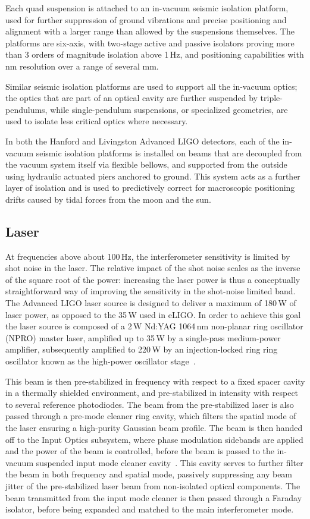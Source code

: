 Each quad suspension is attached to an in-vacuum seismic isolation platform, 
used for further suppression of ground vibrations and precise positioning and 
alignment with a larger range than allowed by the suspensions themselves. The 
platforms are six-axis, with two-stage active and passive isolators proving more 
than 3 orders of magnitude isolation above 1\,Hz, and positioning capabilities 
with nm resolution over a range of several mm.

Similar seismic isolation platforms are used to support all the in-vacuum optics; 
the optics that are part of an optical cavity are further suspended by triple-pendulums, while 
single-pendulum suspensions, or specialized geometries, are used to isolate 
less critical optics where necessary.

In both the Hanford and Livingston Advanced LIGO detectors, 
each of the in-vacuum seismic isolation platforms is 
installed on beams that are decoupled from the vacuum system itself via 
flexible bellows, and supported from the outside using hydraulic actuated 
piers anchored to ground.
This system acts as a further layer of isolation and is used to predictively correct for macroscopic positioning drifts caused by tidal forces from the moon and the sun.

	
\subsection{Laser}
At frequencies above about 100\,Hz, the interferometer sensitivity is limited by shot 
noise in the laser. The relative impact of the shot noise scales as the inverse of the 
square root of the power: increasing the laser power is thus a conceptually 
straightforward way of improving the sensitivity in the shot-noise limited band. 
The Advanced LIGO laser source is designed to deliver a maximum of 180\,W of laser power, as opposed to the 35\,W used in eLIGO.
In order to achieve this goal the laser source is composed of a 2\,W Nd:YAG 1064\,nm non-planar ring oscillator (NPRO) master laser, amplified up to 35\,W by a single-pass medium-power amplifier, subsequently amplified to 220\,W by an injection-locked ring ring oscillator known as the high-power oscillator stage~\cite{Kwee_2012}. 

This beam is then pre-stabilized in frequency with respect to a fixed spacer cavity in a thermally shielded environment, and pre-stabilized in intensity with respect to several reference photodiodes. 
The beam from the pre-stabilized laser is also passed through a pre-mode cleaner ring cavity, which filters the spatial mode of the laser ensuring a high-purity Gaussian beam profile. 
The beam is then handed off to the Input Optics subsystem, where phase modulation sidebands are applied and the power of the beam is controlled, before the beam is passed to the in-vacuum suspended input mode cleaner cavity~\cite{Mueller_2016}. 
This cavity serves to further filter the beam in both frequency and spatial mode, passively suppressing any beam jitter of the pre-stabilized laser beam from non-isolated optical components. 
The beam transmitted from the input mode cleaner is then passed through a Faraday isolator, before being expanded and matched to the 
main interferometer mode.

